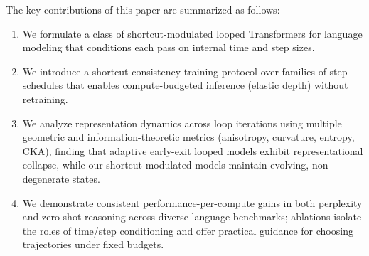 The key contributions of this paper are summarized as follows:
\begin{enumerate}[leftmargin=*,labelindent=0pt,label=\textbf{--}]
    \item We formulate a class of shortcut-modulated looped Transformers for language modeling that conditions each pass on internal time and step sizes. 
    
    \item We introduce a shortcut-consistency training protocol over families of step schedules that enables compute-budgeted inference (elastic depth) without retraining.

    \item We analyze representation dynamics across loop iterations using multiple geometric and information-theoretic metrics (anisotropy, curvature, entropy, CKA), finding that adaptive early-exit looped models exhibit representational collapse, while our shortcut-modulated models maintain evolving, non-degenerate states.
    
    \item We demonstrate consistent performance-per-compute gains in both perplexity and zero-shot reasoning across diverse language benchmarks; ablations isolate the roles of time/step conditioning and offer practical guidance for choosing trajectories under fixed budgets.

\end{enumerate}


